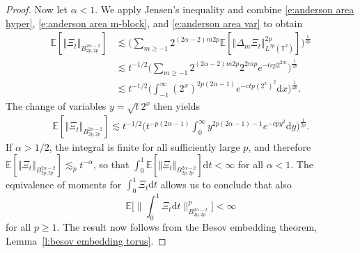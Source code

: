 \documentclass[a4paper,11pt]{article}
\newcommand{\mathd}{\mathrm{d}}
\newtheorem{corollary}[theorem]{Corollary}
\theoremstyle{remark}
\newcommand{\E}{\mathbb{E}}
\newcommand{\CC}{\ensuremath{\mathscr{C}}}
\newcommand{\CF}{\ensuremath{\mathscr{F}}}
\newcommand{\CS}{\ensuremath{\mathscr{S}}}
\newcommand{\reso}{\,\mathord{\circ}\,}
\begin{document}
\begin{proof}
   Now let $\alpha < 1$. We apply Jensen's inequality and combine \eqref{e:anderson area hyper}, \eqref{e:anderson area m-block}, and \eqref{e:anderson area var} to obtain
   \begin{align*}
      \E[\Vert  \Xi_t \Vert_{B^{2 \alpha - 2}_{2 p, 2 p}}] & \lesssim \biggl( \sum_{m \geqslant - 1} 2^{(2 \alpha - 2) m 2 p} \E[\Vert  \Delta_m \Xi_t \Vert_{L^{2 p} (\mathbb{T}^2 )}^{2 p} ] \biggr)^{\frac{1}{2 p}} \\
      & \lesssim t^{- 1 / 2} \biggl( \sum_{m \geqslant - 1} 2^{(2 \alpha - 2) m 2 p} 2^{2 m p} e^{- t c p 2^{2 m}} \biggr)^{\frac{1}{2 p}} \\
      & \lesssim t^{- 1 / 2} \biggl( \int_{- 1}^{\infty} ( 2^x )^{2 p ( 2 \alpha - 1 )} e^{- c t p ( 2^x )^2} \mathd x \biggr)^{\frac{1}{2 p}}.
   \end{align*}
   The change of variables $y = \sqrt{t} 2^x$ then yields
   \begin{align*}
      \E[\Vert  \Xi_t \Vert_{B^{2 \alpha - 2}_{2 p, 2 p}}] \lesssim t^{- 1 / 2} \biggl( t^{- p ( 2 \alpha -1)} \int_0^{\infty} y^{2 p ( 2 \alpha - 1 ) - 1} e^{- c p y^2} \mathd y \biggr)^{\frac{1}{2 p}}.
   \end{align*}
   If $\alpha > 1/2$, the integral is finite for all sufficiently large $p$, and therefore $\E[\Vert  \Xi_t \Vert_{B^{2 \alpha - 2}_{2 p, 2 p}}] \lesssim_p t^{- \alpha}$, so that $\int_0^1 \E[\Vert  \Xi_t \Vert_{B^{2 \alpha - 2}_{2 p, 2 p}}] \mathd t < \infty$ for all $\alpha < 1$. The equivalence of moments for $\int_0^1 \Xi_t \mathd t$ allows us to conclude that also
   \[
      \E \Big[\Big\| \int_0^1 \Xi_t \mathd t\Big\|^p_{B^{2\alpha - 2}_{2p, 2p}} \Big] < \infty
   \]
   for all $p \geqslant 1$. The result now follows from the Besov embedding theorem, Lemma~\ref{l:besov embedding torus}.
\end{proof}

\end{document}
